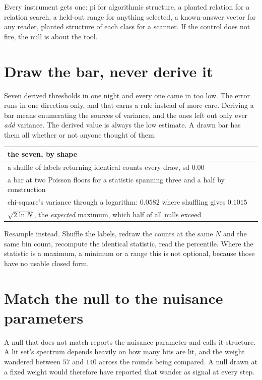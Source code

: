 Every instrument gets one: pi for algorithmic structure, a planted relation for a relation search, a held-out range for anything selected, a known-answer vector for any reader, planted structure of each class for a scanner. If the control does not fire, the null is about the tool.

\section{Draw the bar, never derive it}

Seven derived thresholds in one night and every one came in too low. The error runs in one direction only, and that earns a rule instead of more care. Deriving a bar means enumerating the sources of variance, and the ones left out only ever \emph{add} variance. The derived value is always the low estimate. A drawn bar has them all whether or not anyone thought of them.

\begin{center}
\begin{tabular}{@{}l@{}}
\toprule
the seven, by shape \\
\midrule
a shuffle of labels returning identical counts every draw, sd \(0.00\) \\
a bar at two Poisson floors for a statistic spanning three and a half by construction \\
chi-square's variance through a logarithm: \(0.0582\) where shuffling gives \(0.1015\) \\
\(\sqrt{2 \ln N}\), the \emph{expected} maximum, which half of all nulls exceed \\
\bottomrule
\end{tabular}
\end{center}

Resample instead. Shuffle the labels, redraw the counts at the same \(N\) and the same bin count, recompute the identical statistic, read the percentile. Where the statistic is a maximum, a minimum or a range this is not optional, because those have no usable closed form.

\section{Match the null to the nuisance parameters}

A null that does not match reports the nuisance parameter and calls it structure. A lit set's spectrum depends heavily on how many bits are lit, and the weight wandered between \(57\) and \(140\) across the rounds being compared. A null drawn at a fixed weight would therefore have reported that wander as signal at every step.


